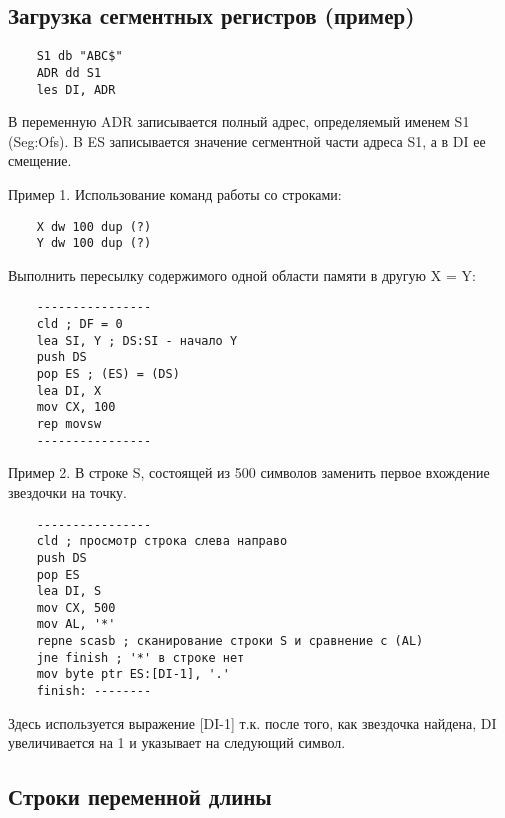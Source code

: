 \subsection{Загрузка сегментных регистров (пример)}
\begin{verbatim}
    S1 db "ABC$"
    ADR dd S1
    les DI, ADR
\end{verbatim}

В переменную ADR записывается полный адрес, определяемый именем S1 (Seg:Ofs). B ES записывается значение сегментной части адреса S1, а в DI ее смещение.

Пример 1. Использование команд работы со строками:
\begin{verbatim}
    X dw 100 dup (?)
    Y dw 100 dup (?)
\end{verbatim}
Выполнить пересылку содержимого одной области памяти в другую
X = Y:
\begin{verbatim}
    ----------------
    cld ; DF = 0
    lea SI, Y ; DS:SI - начало Y
    push DS
    pop ES ; (ES) = (DS)
    lea DI, X
    mov CX, 100
    rep movsw
    ----------------
\end{verbatim}

Пример 2. В строке S, состоящей из 500 символов заменить первое вхождение звездочки на точку.

\begin{verbatim}
    ----------------
    cld ; просмотр строка слева направо
    push DS
    pop ES
    lea DI, S
    mov CX, 500
    mov AL, '*'
    repne scasb ; сканирование строки S и сравнение с (AL)
    jne finish ; '*' в строке нет
    mov byte ptr ES:[DI-1], '.'
    finish: --------
\end{verbatim}

Здесь используется выражение [DI-1] т.к. после того, как звездочка найдена, DI увеличивается на 1 и указывает на следующий символ.

\subsection{Строки переменной длины}

